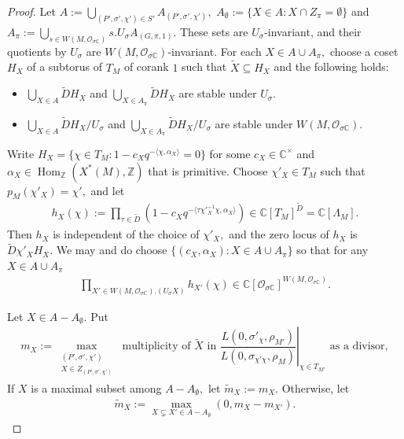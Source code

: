 \documentclass[10pt]{amsart}
\theoremstyle{definition}
\numberwithin{equation}{section}
\DeclareMathOperator{\Hom}{\mathrm{Hom}}
\numberwithin{equation}{subsection}
\newcommand{\ZZ}{\mathbb{Z}}
\newcommand{\CC}{\mathbb{C}}
\begin{document}
\begin{proof}
    Let $A := \bigcup\limits_{(P',\sigma',\chi')\in S'} A_{(P',\sigma',\chi')},$ $A_\emptyset:=\{ X\in A: X\cap Z_\pi= \emptyset\}$ and $A_\pi:=\bigcup_{s\in W(M,\mathcal{O}_{\sigma\CC})} s.U_\sigma A_{(G,\pi,1)}.$ These sets are $U_\sigma$-invariant, and their quotients by $U_\sigma$ are $W(M,\mathcal{O}_{\sigma\CC})$-invariant. For each $X\in A\cup A_\pi,$ choose a coset $H_{X}$ of a subtorus of $T_M$ of corank $1$ such that $\widetilde{X} \subseteq H_{X}$ and the following holds:
    \begin{itemize}
        \item $\bigcup\limits_{X\in A}\widetilde{D} H_X$ and $\bigcup\limits_{X\in A_\pi}\widetilde{D} H_X$  are stable under $U_\sigma.$
        \item $\bigcup\limits_{X\in A}\widetilde{D} H_X/U_\sigma$ and $\bigcup\limits_{X\in A_\pi}\widetilde{D} H_X/U_\sigma$ are stable under $W(M,\mathcal{O}_{\sigma\CC}).$
    \end{itemize}
    Write $H_{X} = \{\chi\in T_M:1 - c_Xq^{-\langle\chi,\alpha_X\rangle}=0\}$ for some $c_X\in \CC^\times$ and $\alpha_X\in \Hom_\ZZ(X^*(M),\ZZ)$ that is primitive. Choose $\chi'_X\in T_M$ such that $p_M(\chi'_X)=\chi',$ and let
    \begin{align*}
        h_X(\chi) := \prod_{\tau\in \widetilde{D}}\left(1 - c_Xq^{-\langle\tau\chi'^{-1}_X\chi,\alpha_X\rangle}\right) \in \CC[T_M]^{\widetilde{D}} = \CC[\Lambda_M].
    \end{align*}
    Then $h_X$ is independent of the choice of $\chi'_X,$ and the zero locus of $h_X$ is $\widetilde{D}\chi'_X H_X.$ We may and do choose $\{(c_X,\alpha_X):X\in A\cup A_\pi\}$ so that for any $X\in A\cup A_\pi$
    \begin{align*}
        \prod_{X'\in W(M,\mathcal{O}_{\sigma\CC}).(U_\sigma X)} h_{X'}(\chi) \in \CC[\mathcal{O}_{\sigma\CC}]^{W(M,\mathcal{O}_{\sigma\CC})}.
    \end{align*}

    Let $X\in A-A_\emptyset.$ Put
    \begin{align*}
         m_X:=  \max_{\substack{(P',\sigma',\chi')\\ X\in Z_{(P',\sigma',\chi')}}} \text{ multiplicity of $\widetilde{X}$ in $\left.\dfrac{L(0,\sigma'_\chi,\rho_{M'})}{L(0,\sigma_{\chi'\chi},\rho_M)}\right|_{\chi\in T_{M'}}$ as a divisor},
    \end{align*}
    If $X$ is a maximal subset among $A-A_\emptyset,$ let $\widetilde{m}_{X}:=m_X$. Otherwise, let
    \begin{align*}
        \widetilde{m}_{X}:=\max_{X\subsetneq X'\in A-A_\emptyset}(0,m_X-m_{X'}).
    \end{align*}
    

\end{proof}
\end{document}
